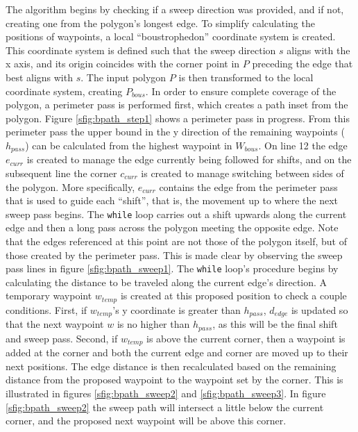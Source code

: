 The algorithm begins by checking if a sweep direction was provided, and if not, creating one from the polygon's longest edge.
To simplify calculating the positions of waypoints, a local ``boustrophedon'' coordinate system is created.
This coordinate system is defined such that the sweep direction $s$ aligns with the x axis, and its origin coincides with the corner point in $P$ preceding the edge that best aligns with $s$.
The input polygon $P$ is then transformed to the local coordinate system, creating $P_{bous}$.
In order to ensure complete coverage of the polygon, a perimeter pass is performed first, which creates a path inset from the polygon.
Figure \ref{sfig:bpath_step1} shows a perimeter pass in progress.
From this perimeter pass the upper bound in the y direction of the remaining waypoints ($h_{pass}$) can be calculated from the highest waypoint in $W_{bous}$.
On line 12 the edge $e_{curr}$ is created to manage the edge currently being followed for shifts, and on the subsequent line the corner $c_{curr}$ is created to manage switching between sides of the polygon.
More specifically, $e_{curr}$ contains the edge from the perimeter pass that is used to guide each ``shift'', that is, the movement up to where the next sweep pass begins.
The \verb|while| loop carries out a shift upwards along the current edge and then a long pass across the polygon meeting the opposite edge.
Note that the edges referenced at this point are not those of the polygon itself, but of those created by the perimeter pass.
This is made clear by observing the sweep pass lines in figure \ref{sfig:bpath_sweep1}.
The \verb|while| loop's procedure begins by calculating the distance to be traveled along the current edge's direction.
A temporary waypoint $w_{temp}$ is created at this proposed position to check a couple conditions.
First, if $w_{temp}$'s y coordinate is greater than $h_{pass}$, $d_{edge}$ is updated so that the next waypoint $w$ is no higher than $h_{pass}$, as this will be the final shift and sweep pass.
Second, if $w_{temp}$ is above the current corner, then a waypoint is added at the corner and both the current edge and corner are moved up to their next positions.
The edge distance is then recalculated based on the remaining distance from the proposed waypoint to the waypoint set by the corner.
This is illustrated in figures \ref{sfig:bpath_sweep2} and \ref{sfig:bpath_sweep3}.
In figure \ref{sfig:bpath_sweep2} the sweep path will intersect a little below the current corner, and the proposed next waypoint will be above this corner.
